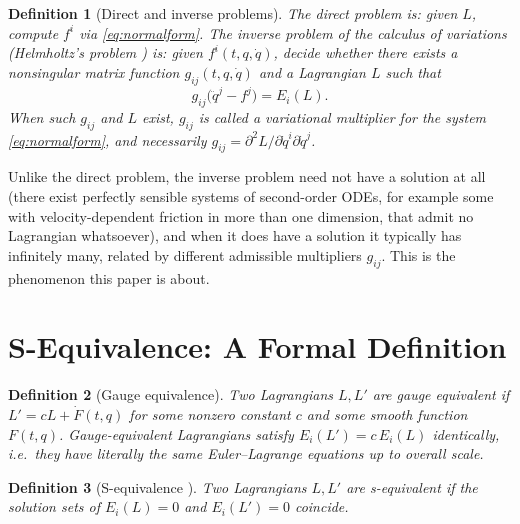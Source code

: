 \documentclass[11pt]{article}
\newtheorem{definition}{Definition}[section]
\theoremstyle{remark}
\begin{document}
\begin{definition}[Direct and inverse problems]
The \emph{direct problem} is: given $L$, compute $f^i$ via \eqref{eq:normalform}. The \emph{inverse problem of the calculus of variations} (Helmholtz's problem \cite{Helmholtz1887}) is: given $f^i(t,q,\dot q)$, decide whether there exists a nonsingular matrix function $g_{ij}(t,q,\dot q)$ and a Lagrangian $L$ such that
\begin{equation}
g_{ij}\big(\ddot q^j - f^j\big) = E_i(L).
\label{eq:multiplier-relation}
\end{equation}
When such $g_{ij}$ and $L$ exist, $g_{ij}$ is called a \emph{variational multiplier} for the system \eqref{eq:normalform}, and necessarily $g_{ij}=\partial^2 L/\partial \dot q^i\partial\dot q^j$.
\end{definition}

Unlike the direct problem, the inverse problem need not have a solution at all (there exist perfectly sensible systems of second-order ODEs, for example some with velocity-dependent friction in more than one dimension, that admit no Lagrangian whatsoever), and when it does have a solution it typically has infinitely many, related by different admissible multipliers $g_{ij}$. This is the phenomenon this paper is about.

\section{S-Equivalence: A Formal Definition}

\begin{definition}[Gauge equivalence]
Two Lagrangians $L,L'$ are \emph{gauge equivalent} if $L' = cL + \dot F(t,q)$ for some nonzero constant $c$ and some smooth function $F(t,q)$. Gauge-equivalent Lagrangians satisfy $E_i(L')=c\,E_i(L)$ identically, i.e.\ they have literally the same Euler--Lagrange equations up to overall scale.
\end{definition}

\begin{definition}[S-equivalence \cite{HenneauxShepley1982}]
\label{def:sequiv}
Two Lagrangians $L,L'$ are \emph{s-equivalent} if the solution sets of $E_i(L)=0$ and $E_i(L')=0$ coincide.
\end{definition}
\end{document}
